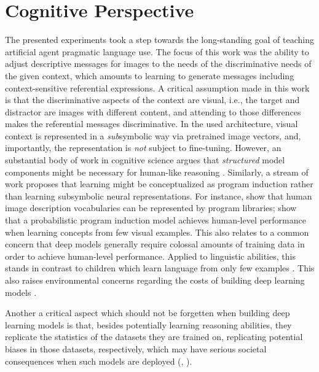 \section{Cognitive Perspective}
The presented experiments took a step towards the long-standing goal of teaching artificial agent pragmatic language use. The focus of this work was the ability to adjust descriptive messages for images to the needs of the discriminative needs of the given context, which amounts to learning to generate messages including context-sensitive referential expressions. A critical assumption made in this work is that the discriminative aspects of the context are visual, i.e., the target and distractor are images with different content, and attending to those differences makes the referential messages discriminative. In the used architecture, visual context is represented in a \emph{sub}symbolic way via pretrained image vectors, and, importantly, the representation is \emph{not} subject to fine-tuning. However, an substantial body of work in cognitive science argues that \emph{structured} model components might be necessary for human-like reasoning \parencite[e.~g.,][]{tenenbaum2011grow}. 
Similarly, a stream of work proposes that learning  might be conceptualized as program induction rather than learning subsymbolic neural representations. For instance, \cite{wong2022identifying} show that human image description vocabularies can be represented by program libraries; \cite{lake2015human} show that a probabilistic program induction model achieves human-level performance when learning concepts from few visual examples. This also relates to a common concern that deep models generally require colossal amounts of training data in order to achieve human-level performance. Applied to linguistic abilities, this stands in contrast to children which learn language from only few examples \parencite[e.~g.,][]{xu2007word}. This also raises environmental concerns regarding the costs of building deep learning models \parencite{bender2021dangers}.  

Another a critical aspect which should not be forgetten when building deep learning models is that, besides potentially learning reasoning abilities, they replicate the statistics of the datasets they are trained on, replicating potential biases in those datasets, respectively, which may have serious societal consequences when such models are deployed (\cite{bender2021dangers}, \cite{buolamwini2018gender}). 

